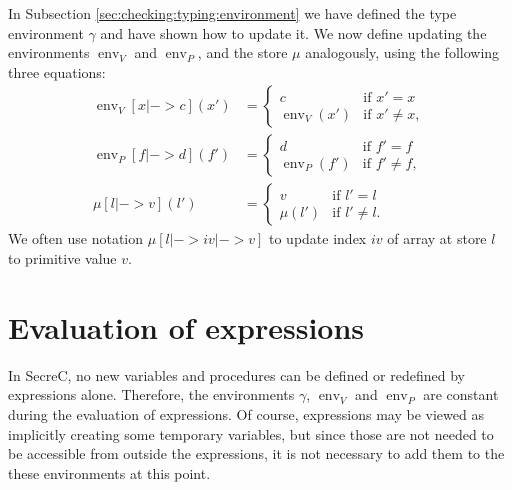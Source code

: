 \documentclass[a4paper, 10pt, draft]{report}
\begin{document}
In Subsection \ref{sec:checking:typing:environment} we have defined the type
environment $\gamma$ and have shown how to update it. We now define updating
the environments $\operatorname{env}_V$ and $\operatorname{env}_P$, and the
store $\mu$ analogously, using the following three equations:
\begin{align*}
    \operatorname{env}_V\!\left[ x |-> c \right]\!\left(x'\right) & = \left\{\begin{array}{ll}
        c                                     & \text{if $x' = x$} \\
        \operatorname{env}_V\!\left(x'\right) & \text{if $x' \not = x$},
    \end{array}\right. \\
    \operatorname{env}_P\!\left[ f |-> d \right]\!\left(f'\right) & = \left\{\begin{array}{ll}
        d                                     & \text{if $f' = f$} \\
        \operatorname{env}_P\!\left(f'\right) & \text{if $f' \not = f$},
    \end{array}\right. \\
    \mu\!\left[ l |-> v \right]\!\left(l'\right) & = \left\{\begin{array}{ll}
        v                    & \text{if $l' = l$} \\
        \mu\!\left(l'\right) & \text{if $l' \not = l$}.
    \end{array}\right.
\end{align*}
We often use notation $\mu[l |-> i\!v |-> v ]$ to update index $i\!v$ of array
at store $l$ to primitive value $v$.


\section{Evaluation of expressions}\label{sec:semantics:expr}

In SecreC, no new variables and procedures can be defined or redefined by
expressions alone. Therefore, the environments $\gamma$, $\operatorname{env}_V$
and $\operatorname{env}_P$ are constant during the evaluation of expressions.
Of course, expressions may be viewed as implicitly creating some temporary
variables, but since those are not needed to be accessible from outside the
expressions, it is not necessary to add them to the these environments at this
point.
\end{document}
